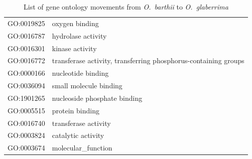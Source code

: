 \documentclass[10pt,letterpaper]{article}
\begin{document}
\begin{table}[]
\begin{tabular}{ll}
GO:0019825     & oxygen binding                              \\
GO:0016787     & hydrolase activity                          \\
GO:0016301     & kinase activity                             \\
GO:0016772     & transferase activity, transferring phosphorus-containing groups \\
GO:0000166     & nucleotide binding                          \\
GO:0036094     & small molecule binding                      \\
GO:1901265     & nucleoside phosphate binding                \\
GO:0005515     & protein binding                             \\
GO:0016740     & transferase activity                        \\
GO:0003824     & catalytic activity                          \\
GO:0003674     & molecular\_function                        
\end{tabular}
\caption{List of gene ontology movements from \emph{O.~barthii} to \emph{O.~glaberrima}}
\label{GOenrichment}
\end{table}
\end{document}
